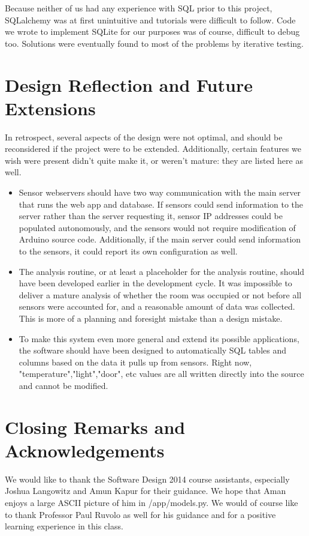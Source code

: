 \documentclass{article}
\begin{document}
\par Because neither of us had any experience with SQL prior to this project, SQLalchemy was at first unintuitive and tutorials were difficult to follow. Code we wrote to implement SQLite for our purposes was of course, difficult to debug too. Solutions were eventually found to most of the problems by iterative testing.

\section*{Design Reflection and Future Extensions}
\par In retrospect, several aspects of the design were not optimal, and should be reconsidered if the project were to be extended.  Additionally, certain features we wish were present didn't quite make it, or weren't mature: they are listed here as well.
\begin{itemize}
    \item Sensor webservers should have two way communication with the main server that runs the web app and database. If sensors could send information to the server rather than the server requesting it, sensor IP addresses could be populated autonomously, and the sensors would not require modification of Arduino source code. Additionally, if the main server could send information to the sensors, it could report its own configuration as well.
    \item The analysis routine, or at least a placeholder for the analysis routine, should have been developed earlier in the development cycle. It was impossible to deliver a mature analysis of whether the room was occupied or not before all sensors were accounted for, and a reasonable amount of data was collected. This is more of a planning and foresight mistake than a design mistake.
    \item To make this system even more general and extend its possible applications, the software should have been designed to automatically SQL tables and columns based on the data it pulls up from sensors.  Right now, "temperature","light","door", etc values are all written directly into the source and cannot be modified.
\end{itemize}

\section*{Closing Remarks and Acknowledgements}
We would like to thank the Software Design 2014 course assistants, especially Joshua Langowitz and Amun Kapur for their guidance.  We hope that Aman enjoys a large ASCII picture of him in /app/models.py. We would of course like to thank Professor Paul Ruvolo as well for his guidance and for a positive learning experience in this class.
\end{document}
